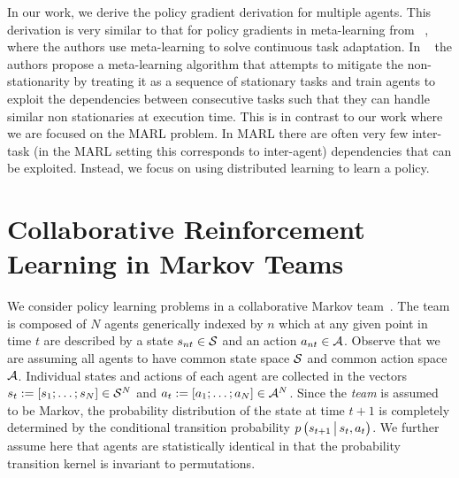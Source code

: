 \documentclass{article}
\begin{document}
In our work, we derive the policy gradient derivation for multiple agents. This derivation is very similar to that for policy gradients in meta-learning from ~\cite{al2017continuous,maml}, where the authors use meta-learning to solve continuous task adaptation. In ~\cite{al2017continuous} the authors propose a meta-learning algorithm that attempts to mitigate the non-stationarity by treating it as a sequence of stationary tasks and train agents to exploit the dependencies between consecutive
tasks such that they can handle similar non stationaries at execution time. This is in contrast to our work where we are focused on the MARL problem. In MARL there are often very few inter-task (in the MARL setting this corresponds to inter-agent) dependencies that can be exploited. Instead, we focus on using distributed learning to learn a policy.

\section{Collaborative Reinforcement Learning in Markov Teams}

We consider policy learning problems in a collaborative Markov team~\cite{littman1994markov}. The team is composed of $N$ agents generically indexed by $n$ which at any given point in time $t$ are described by a state $s_{nt}\in{\ensuremath{\mathcal S}}$ and an action $a_{nt}\in{\ensuremath{\mathcal A}}$. Observe that we are assuming all agents to have common state space ${\mathcal S}$ and common action space ${\mathcal A}$. Individual states and actions of each agent are collected in the vectors $s_{t}:=[s_1;\ldots;s_N]\in{\ensuremath{\mathcal S}}^N$ and $a_{t}:=[a_1;\ldots;a_N]\in{\ensuremath{\mathcal A}}^N$. Since the {\it team} is assumed to be Markov, the probability distribution of the state at time $t+1$ is completely determined by the conditional transition probability $p \left(s_{t+1}{\,\big|\, } s_t, a_t\right)$. We further assume here that agents are statistically identical in that the probability transition kernel is invariant to permutations. 
\end{document}
